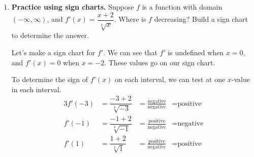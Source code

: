 \documentclass[main]{subfiles}
\begin{document}
\begin{enumerate}[resume]
\begin{enumerate}[resume]
{      This is the last part that's important to cover today.
    }

    \begin{problem}[0.15in]
     \textbf{Key Skill:} There are many situations  where we want to determine the sign of a function.  If you want to make a \textbf{sign chart} for $g(x)$ and $g(x)$ is given by a single (non-piecewise) algebraic formula, you should start by finding values of $x$ where $g(x)$ is . 
    \end{problem}

  \end{enumerate}

\item 

  \begin{problem}[\vfill]
    \textbf{Practice using sign charts.} Suppose $f$ is a function with domain $(-\infty, \infty)$, and $f'(x) = \dfrac{x + 2}{\sqrt[3]{x}}$. Where is $f$ decreasing? Build a sign chart to determine the answer.
  \end{problem}

  \begin{solution}
    Let's make a sign chart for $f'$. We can see that $f'$ is undefined when $x=0$, and
    $f'(x)=0$ when $x=-2$. These values go on our sign chart.

      \begin{center}
      \end{center}

      To determine the sign of $f'(x)$ on each interval, we can test at one $x$-value in
      each interval.
      \begin{alignat*}{3}
      f'(-3) &= \dfrac{-3+2}{\sqrt[3]{-3}} &=\frac{\text{negative}}{\text{negative}} 
      &= \text{positive} \\
      f'(-1) &= \dfrac{-1+2}{\sqrt[3]{-1}} &=\frac{\text{positive}}{\text{negative}}
      &= \text{negative} \\
      f'(1) &= \dfrac{1+2}{\sqrt[3]{1}} &=\frac{\text{positive}}{\text{negative}}
      &= \text{positive}
      \end{alignat*}


\end{solution}
\end{enumerate}
\end{document}

